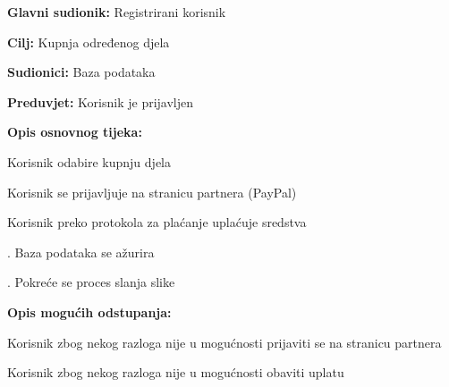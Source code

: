 					\noindent {}
					\begin{packed_item}
						
						\item \textbf{Glavni sudionik: } Registrirani korisnik
						\item  \textbf{Cilj:} Kupnja određenog djela
						\item  \textbf{Sudionici:} Baza podataka
						\item  \textbf{Preduvjet:} Korisnik je prijavljen
						\item  \textbf{Opis osnovnog tijeka:}
						
						\item[] \begin{packed_enum}
							
							\item Korisnik odabire kupnju djela						
							\item Korisnik se prijavljuje na stranicu partnera (PayPal)							
							\item Korisnik preko protokola za plaćanje uplaćuje sredstva
							\item . Baza podataka se ažurira
							\item . Pokreće se proces slanja slike 

						\end{packed_enum}
						
						\item \textbf{Opis mogućih odstupanja:} 					
							\item[] \begin{packed_enum}
							\item Korisnik zbog nekog razloga nije u mogućnosti prijaviti se na stranicu partnera
							\item Korisnik zbog nekog razloga nije u mogućnosti obaviti uplatu
						\end{packed_enum}


	
					\end{packed_item}
					
